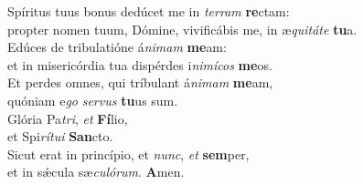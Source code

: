 \evenverse Spíritus tuus bonus dedúcet me in \textit{ter}\textit{ram} \textbf{re}ctam:~\*\\
\evenverse propter nomen tuum, Dómine, vivificábis me, in æ\textit{qui}\textit{tá}\textit{te} \textbf{tu}a.\\
\oddverse Edúces de tribulatióne á\textit{ni}\textit{mam} \textbf{me}am:~\*\\
\oddverse et in misericórdia tua dispérdes i\textit{ni}\textit{mí}\textit{cos} \textbf{me}os.\\
\evenverse Et perdes omnes, qui tríbulant á\textit{ni}\textit{mam} \textbf{me}am,~\*\\
\evenverse quóniam e\textit{go} \textit{ser}\textit{vus} \textbf{tu}us sum.\\
\oddverse Glória Pa\textit{tri}, \textit{et} \textbf{Fí}lio,~\*\\
\oddverse et Spi\textit{rí}\textit{tu}\textit{i} \textbf{San}cto.\\
\evenverse Sicut erat in princípio, et \textit{nunc}, \textit{et} \textbf{sem}per,~\*\\
\evenverse et in sǽcula sæ\textit{cu}\textit{ló}\textit{rum}. \textbf{A}men.\\

